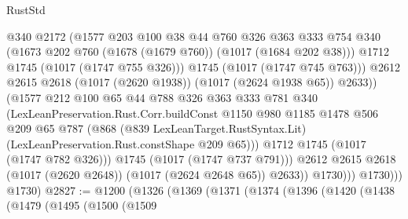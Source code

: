 \begin{lexlean}{RustStd}
\begin{coremodule}
                              @340
                              @2172
                              (@1577
                                @203
                                @100
                                @38
                                @44
                                @760
                                @326
                                @363
                                @333
                                @754
                                @340
                                (@1673 @202 @760 (@1678 (@1679 @760)) (@1017 (@1684 @202 @38)))
                                @1712
                                @1745
                                (@1017 (@1747 @755 @326)))
                              @1745
                              (@1017 (@1747 @745 @763)))
                            @2612
                            @2615
                            @2618
                            (@1017 (@2620 @1938))
                            (@1017 (@2624 @1938 @65))
                            @2633))
                        (@1577
                          @212
                          @100
                          @65
                          @44
                          @788
                          @326
                          @363
                          @333
                          @781
                          @340
                          (LexLeanPreservation.Rust.Corr.buildConst
                            @1150
                            @980
                            @1185
                            @1478
                            @506
                            @209
                            @65
                            @787
                            (@868
                              (@839 LexLeanTarget.RustSyntax.Lit)
                              (LexLeanPreservation.Rust.constShape @209 @65)))
                          @1712
                          @1745
                          (@1017 (@1747 @782 @326)))
                        @1745
                        (@1017 (@1747 @737 @791)))
                      @2612
                      @2615
                      @2618
                      (@1017 (@2620 @2648))
                      (@1017 (@2624 @2648 @65))
                      @2633))
                  @1730)))
            @1730)))
      @1730)
@2827 := @1200
    (@1326
      (@1369
        (@1371
          (@1374
            (@1396
              (@1420
                (@1438
                  (@1479
                    (@1495
                      (@1500
                        (@1509

\end{coremodule}
\end{lexlean}
